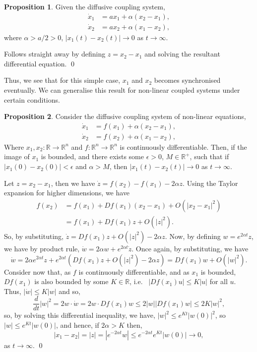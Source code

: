 \documentclass[
]{article}
\theoremstyle{definition}
\newtheorem{prop}{Proposition}[theorem]
\theoremstyle{definition}
\begin{document}
\begin{prop}
  Given the diffusive coupling system, 
  \begin{align*}
    \dot x_1 & = ax_1 + \alpha(x_2 - x_1),\\
    \dot x_2 & = ax_2 + \alpha(x_1 - x_2),
  \end{align*}
  where \(\alpha > a / 2 > 0\), \(\left| x_1(t) - x_2(t) \right| \to 0\) as 
  \(t \to \infty\).
\end{prop}
\proof

Follows straight away by defining \(z = x_2 - x_1\) and solving the
resultant differential equation. \qed

Thus, we see that for this simple case, \(x_1\) and \(x_2\) becomes
synchronised eventually. We can generalise this result for non-linear
coupled systems under certain conditions.

\begin{prop}
  Consider the diffusive coupling system of non-linear equations,
  \begin{align*}
    \dot x_1 & = f(x_1) + \alpha (x_2 - x_1),\\
    \dot x_2 & = f(x_2) + \alpha (x_1 - x_2),
  \end{align*}
  Where \(x_1, x_2 : \mathbb{R} \to \mathbb{R}^n\) and 
  \(f : \mathbb{R}^n \to \mathbb{R}^n\) is continuously differentiable.
  Then, if the image of \(x_1\) is bounded, and there exists some 
  \(\epsilon > 0\), \(M \in \mathbb{R}^+\), such that if 
  \(\left| x_1(0) - x_2(0) \right| < \epsilon\) and \(\alpha > M\), then 
  \(\left| x_1(t) - x_2(t) \right| \to 0\) as \(t \to \infty\).
\end{prop}
\proof

Let \(z = x_2 - x_1\), then we have
\(\dot z = f(x_2) - f(x_1) - 2 \alpha z\). Using the Taylor expansion
for higher dimensions, we have \begin{align*}
    f(x_2) & = f(x_1) + Df(x_1)(x_2 - x_1) + O(\left|x_2 - x_1\right|^2)\\
      & = f(x_1) + Df(x_1)z + O(\left|z \right|^2).
  \end{align*} So, by substituting,
\(\dot z = Df(x_1)z + O(\left| z\right|^2) - 2 \alpha z\). Now, by
defining \(w = e^{2\alpha t}z\), we have by product rule,
\(\dot w = 2 \alpha w + e^{2\alpha t} \dot z\). Once again, by
substituting, we have
\[\dot w = 2 \alpha e^{2 \alpha t}z + e^{2 \alpha t}
    (Df(x_1)z + O(\left| z\right|^2) - 2 \alpha z) = Df(x_1)w + O(\left| w \right|^2).\]
Consider now that, as \(f\) is continuously differentiable, and as
\(x_1\) is bounded, \(Df(x_1)\) is also bounded by some
\(K \in \mathbb{R}\), i.e.~
\(\left| Df(x_1)u \right| \le K\left| u \right|\) for all \(u\). Thus,
\(\left| \dot w \right| \le K \left| w \right|\) and so,
\[\frac{d}{dt}\left| w\right|^2 = 2w \cdot \dot w = 2w \cdot Df(x_1)w \le 
    2 \left| w \right| \left| Df(x_1) w \right| \le 2 K \left|w\right|^2,\]
so, by solving this differential inequality, we have,
\(\left|w\right|^2 \le e^{Kt}\left| w(0)\right|^2\), so
\(\left|w\right| \le e^{Kt}\left| w(0)\right|\), and hence, if
\(2\alpha > K\) then,
\[\left| x_1 - x_2\right| = \left| z \right| = \left| e^{-2\alpha t}w \right| 
    \le e^{-2\alpha t}e^{Kt} \left| w(0)\right| \to 0,\] as
\(t \to \infty\). \qed
\end{document}
